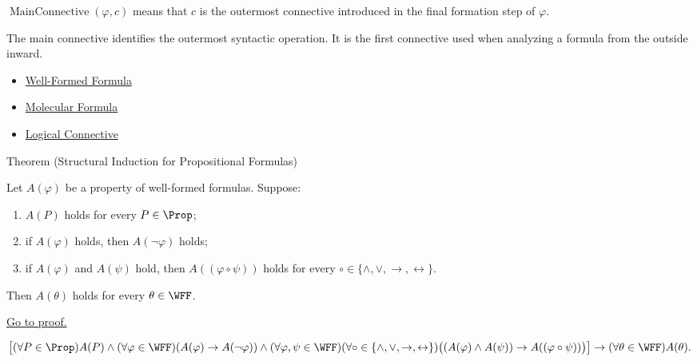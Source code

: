 \begin{remark*}
\(\operatorname{MainConnective}(\varphi,c)\) means that \(c\) is the outermost connective introduced in the final formation step of \(\varphi\).
\end{remark*}

\begin{remark*}[Interpretation]
The main connective identifies the outermost syntactic operation. It is the first connective used when analyzing a formula from the outside inward.
\end{remark*}

\begin{dependencies}
\begin{itemize}
  \item \hyperref[def:well-formed-formula]{Well-Formed Formula}
  \item \hyperref[def:molecular-formula-propositional-logic]{Molecular Formula}
  \item \hyperref[def:logical-connective]{Logical Connective}
\end{itemize}
\end{dependencies}
\begin{theorembox}{Theorem (Structural Induction for Propositional Formulas)}
\begin{theorem}
\label{thm:structural-induction-propositional-formulas}
Let \(A(\varphi)\) be a property of well-formed formulas. Suppose:
\begin{enumerate}
\item \(A(P)\) holds for every \(P\in\Prop\);
\item if \(A(\varphi)\) holds, then \(A(\neg\varphi)\) holds;
\item if \(A(\varphi)\) and \(A(\psi)\) hold, then \(A((\varphi\circ\psi))\) holds for every \(\circ\in\{\land,\lor,\to,\leftrightarrow\}\).
\end{enumerate}
Then \(A(\theta)\) holds for every \(\theta\in\WFF\).

\noindent\hyperref[prf:structural-induction-propositional-formulas]{Go to proof.}
\end{theorem}
\end{theorembox}

\begin{remark*}
\[
\left[
(\forall P\in\Prop)A(P)
\land
(\forall\varphi\in\WFF)(A(\varphi)\to A(\neg\varphi))
\land
(\forall\varphi,\psi\in\WFF)
(\forall\circ\in\{\land,\lor,\to,\leftrightarrow\})
\bigl((A(\varphi)\land A(\psi))\to A((\varphi\circ\psi))\bigr)
\right]
\to
(\forall\theta\in\WFF)A(\theta).
\]
\end{remark*}

